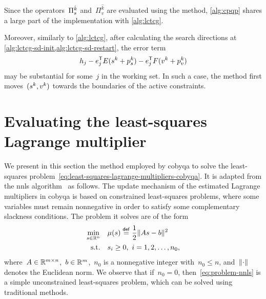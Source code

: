 Since the operators~$\Pi_{\sstep}^{\hat{k}}$ and~$\Pi_v^{\hat{k}}$ are evaluated using the \citeauthor{Goldfarb_Idnani_1983} method, \cref{alg:cpqp} shares a large part of the implementation with \cref{alg:lctcg}.

Moreover, similarly to \cref{alg:lctcg}, after calculating the search directions at \cref{alg:lctcg-sd-init,alg:lctcg-sd-restart}, the error term
\begin{equation*}
    h_j - e_j^{\T} E (\sstep[k] + \pstep[k]_{\sstep}) - e_j^{\T} F (v^k + \pstep[k]_v)
\end{equation*}
may be substantial for some~$j$ in the working set.
In such a case, the method first moves~$(\sstep[k], v^k)$ towards the boundaries of the active constraints.


\section{Evaluating the least-squares Lagrange multiplier}
\label{sec:cobyqa-lagrange-multipliers}

We present in this section the method employed by \gls{cobyqa} to solve the least-squares problem~\cref{eq:least-squares-lagrange-multipliers-cobyqa}.
It is adapted from the \gls{nnls} algorithm~\cite[Alg.~23.10]{Lawson_Hanson_1987} as follows.
The update mechanism of the estimated Lagrange multipliers in \gls{cobyqa} is based on constrained least-squares problems, where some variables must remain nonnegative in order to satisfy some complementary slackness conditions.
The problem it solves are of the form
\begin{subequations}
    \label{eq:problem-nnls}
    \begin{align}
        \min_{\sstep \in \R^n}  & \quad \mu(\sstep) \eqdef \frac{1}{2} \norm{A \sstep - b}^2\\
        \text{s.t.}             & \quad \sstep_i \ge 0, ~ i = 1, 2, \dots, n_0,
    \end{align}
\end{subequations}
where~$A \in \mathbb{R}^{m \times n}$,~$b \in \mathbb{R}^m$,~$n_0$ is a nonnegative integer with~$n_0 \le n$, and~$\lVert\cdot\rVert$ denotes the Euclidean norm.
We observe that if~$n_0 = 0$, then~\cref{eq:problem-nnls} is a simple unconstrained least-squares problem, which can be solved using traditional methods.

